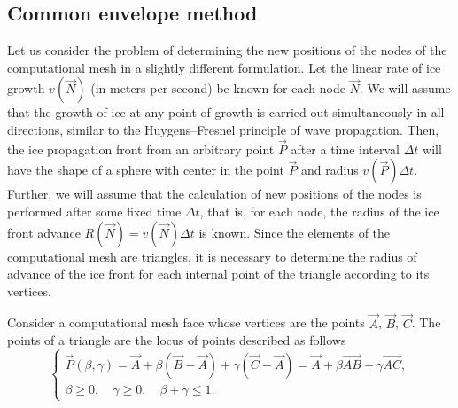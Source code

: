\documentclass[
11pt,%
tightenlines,%
twoside,%
onecolumn,%
nofloats,%
nobibnotes,%
nofootinbib,%
superscriptaddress,%
noshowpacs,%
centertags]%
{revtex4-2}
\begin{document}
\subsection{Common envelope method}
Let us consider the problem of determining the new positions of the
nodes of the computational mesh in a slightly different formulation.
Let the linear rate of ice growth $v(\vec{N})$ (in meters per
second) be  known for each node $\vec{N}$.
We will assume that the growth of ice at any point of growth  is
carried out simultaneously in all directions, similar to the
Huygens--Fresnel principle of wave propagation.
Then, the ice propagation front from an arbitrary point $\vec{P}$
after a time interval $\Delta t$ will have the shape of a sphere
with center in the point $\vec{P}$ and radius $v(\vec{P}) \Delta t$.
Further, we will assume that the calculation of new positions of the nodes is performed after some fixed time $\Delta t$, that is, for each node, the radius of the ice front advance $R(\vec{N}) = v(\vec{N}) \Delta t$ is known.
Since the elements of the computational mesh are triangles, it is
necessary to determine the radius of advance of the ice front for
each internal point of the triangle according to its vertices.

Consider a computational mesh face whose vertices are the points $\vec{A}$, $\vec{B}$, $\vec{C}$.
The points of a triangle are the locus of points described as
follows
\begin{equation}
\begin{cases}
\vec{P}(\beta, \gamma) = \vec{A} + \beta (\vec{B} - \vec{A}) + \gamma (\vec{C} -
\vec{A}) = \vec{A} + \beta \vec{AB} + \gamma \vec{AC}, \\
\beta \ge 0, \quad \gamma \ge 0, \quad \beta + \gamma \le 1.
\end{cases}
\end{equation}
\end{document}

